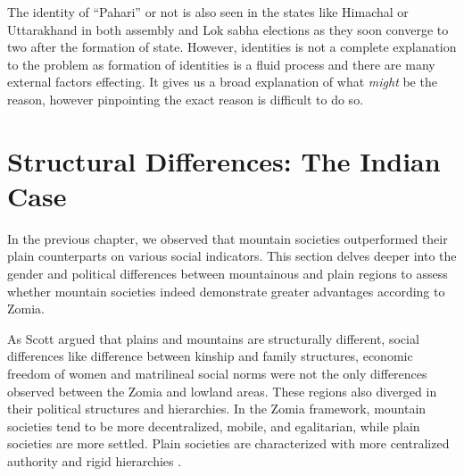 The identity of ``Pahari'' or not is also seen in the states like Himachal or Uttarakhand in both assembly and Lok sabha elections as they soon converge to two after the formation of state. However, identities is not a complete explanation to the problem as formation of identities is a fluid process and there are many external factors effecting. It gives us a broad explanation of what \textit{might} be the reason, however pinpointing the exact reason is difficult to do so.
 



\section{Structural Differences: The Indian Case}
\begin{sloppypar}
    
 In the previous chapter, we observed that mountain societies outperformed their plain counterparts on various social indicators. This section delves deeper into the gender and political differences between mountainous and plain regions to assess whether mountain societies indeed demonstrate greater advantages according to Zomia. 
\end{sloppypar}
As Scott argued that plains and mountains are structurally different, social differences like difference between kinship and family structures, economic freedom of women and matrilineal social norms were not the only differences observed between the Zomia and lowland areas. These regions also diverged in their political structures and hierarchies. In the Zomia framework, mountain societies tend to be more decentralized, mobile, and egalitarian, while plain societies are more settled. Plain societies are characterized with more centralized authority and rigid hierarchies \citep{Hammond_2011}.


